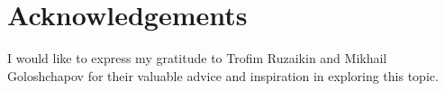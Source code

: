 \section{Acknowledgements}


I would like to express my gratitude to Trofim Ruzaikin and Mikhail Goloshchapov for their valuable advice and inspiration in exploring this topic.
